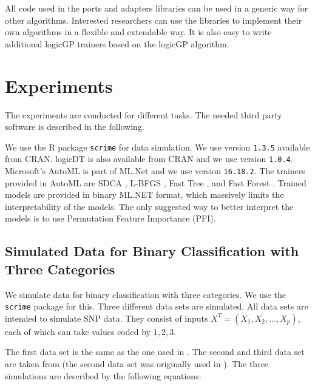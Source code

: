 \documentclass[dvipsnames,format=sigconf,anonymous=false,review=false]{acmart}
\begin{document}
All code used in the ports and adapters libraries can be used in a generic way for other algorithms. Interested researchers can use the libraries to implement their own algorithms in a flexible and extendable way. It is also easy to write additional logicGP trainers based on the logicGP algorithm.  

  

\section{Experiments}\label{sec:exmperiments}

The experiments are conducted for different tasks. The needed third party software is described in the following.
 
We use the R package \texttt{scrime} for data simulation. We use version \texttt{1.3.5} available from CRAN. logicDT is also available from CRAN and we use version \texttt{1.0.4}. Microsoft's AutoML is part of ML.Net and we use version \texttt{16.18.2}. The trainers provided in AutoML are SDCA \cite{10.1145/2086737.2086743,10.5555/2567709.2502598}, L-BFGS  \cite{liu_limited_1989}, Fast Tree \cite{10.5555/3294996.3295074}, and Fast Forest \cite{JMLR:v7:meinshausen06a}. Trained models are provided in binary ML.NET format, which massively limits the interpretability of the models. The only suggested way to better interpret the models is to use Permutation Feature Importance (PFI).

\subsection{Simulated Data for Binary Classification with Three Categories}

We simulate data for binary classification with three categories. We use the \texttt{scrime} package for this. Three different data sets are simulated. All data sets are intended to simulate SNP data. They consist of inputs $X^T=(X_1,X_2,\ldots,X_p)$, each of which can take values coded by $1,2,3$.

The first data set is the same as the one used in \citet{10.1093/bioinformatics/btm522,Nunkesser2008b,bioinformatics24}. The second and third data set are taken from \citet{lau_evaluation_2022} (the second data set was originally used in \citet{huls_comparison_2017}). The three simulations are described by the  following equations:
\end{document}

